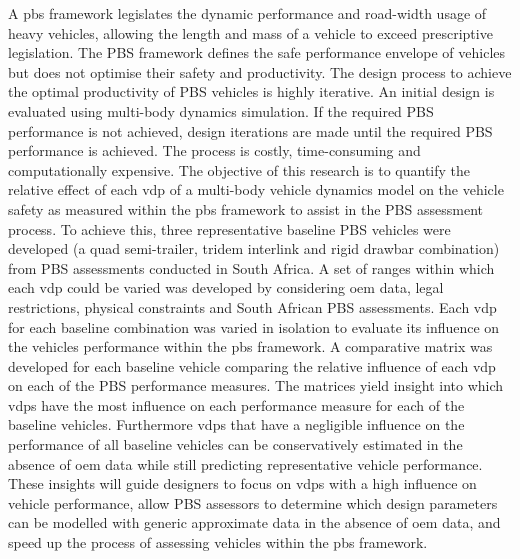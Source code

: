 \justify
A \gls{pbs} framework legislates the dynamic performance and road-width usage of heavy vehicles, allowing the length and mass of a vehicle to exceed prescriptive legislation. The PBS framework defines the safe performance envelope of vehicles but does not optimise their safety and productivity. The design process to achieve the optimal productivity of PBS vehicles is highly iterative. An initial design is evaluated using multi-body dynamics simulation. If the required PBS performance is not achieved, design iterations are made until the required PBS performance is achieved. The process is costly, time-consuming and computationally expensive. The objective of this research is to quantify the relative effect of each \gls{vdp} of a multi-body vehicle dynamics model on the vehicle safety as measured within the \gls{pbs} framework to assist in the PBS assessment process. To achieve this, three representative baseline PBS vehicles were developed (a quad semi-trailer, tridem interlink and rigid drawbar combination) from PBS assessments conducted in South Africa. A set of ranges within which each \gls{vdp} could be varied was developed by considering \gls{oem} data, legal restrictions, physical constraints and South African PBS assessments. Each \gls{vdp} for each baseline combination was varied in isolation to evaluate its influence on the vehicles performance within the \gls{pbs} framework. A comparative matrix was developed for each baseline vehicle comparing the relative influence of each \gls{vdp} on each of the PBS performance measures. The matrices yield insight into which \glspl{vdp} have the most influence on each performance measure for each of the baseline vehicles. Furthermore \glspl{vdp} that have a negligible influence on the performance of all baseline vehicles can be conservatively estimated in the absence of \gls{oem} data while still predicting representative vehicle performance. These insights will guide designers to focus on \glspl{vdp} with a high influence on vehicle performance, allow PBS assessors to determine which design parameters can be modelled with generic approximate data in the absence of \gls{oem} data, and speed up the process of assessing vehicles within the \gls{pbs} framework.